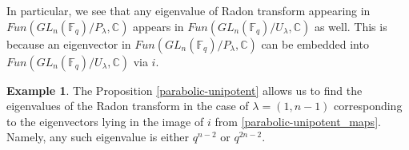 \documentclass[12pt,reqno]{amsart}
\theoremstyle{definition}
\newtheorem{ex}[thm]{Example}
\theoremstyle{remark}
\numberwithin{equation}{section}
\begin{document}
In particular, we see that any eigenvalue of Radon transform appearing in \linebreak $Fun(GL_n(\mathbb{F}_q)/P_{\lambda},\mathbb{C})$ appears in $Fun(GL_n(\mathbb{F}_q)/U_{\lambda},\mathbb{C})$ as well. This is because an eigenvector in $Fun(GL_n(\mathbb{F}_q)/P_{\lambda},\mathbb{C})$ can be embedded into $Fun(GL_n(\mathbb{F}_q)/U_{\lambda},\mathbb{C})$ via $i$.\\


\begin{ex}
    The Proposition \ref{parabolic-unipotent} allows us to find the eigenvalues of the Radon transform in the case of $\lambda = (1, n-1)$ corresponding to the eigenvectors lying in the image of $i$ from \eqref{parabolic-unipotent_maps}. Namely, any such eigenvalue is either $q^{n-2}$ or $q^{2n-2}$.\\
\end{ex}
\end{document}
